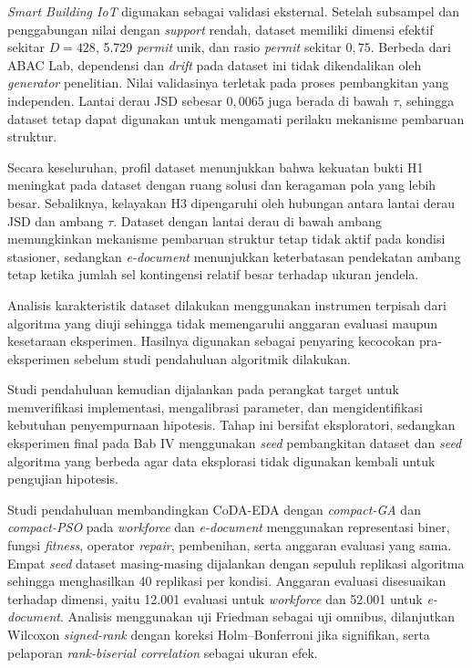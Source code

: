\textit{Smart Building IoT} digunakan sebagai validasi eksternal. 
Setelah subsampel dan penggabungan nilai dengan \textit{support} rendah, dataset memiliki dimensi efektif sekitar $D=428$, 5.729 \textit{permit} unik, dan rasio \textit{permit} sekitar $0,75$. 
Berbeda dari ABAC Lab, dependensi dan \textit{drift} pada dataset ini tidak dikendalikan oleh \textit{generator} penelitian. 
Nilai validasinya terletak pada proses pembangkitan yang independen. 
Lantai derau JSD sebesar $0,0065$ juga berada di bawah $\tau$, sehingga dataset tetap dapat digunakan untuk mengamati perilaku mekanisme pembaruan struktur.

Secara keseluruhan, profil dataset menunjukkan bahwa kekuatan bukti H1 meningkat pada dataset dengan ruang solusi dan keragaman pola yang lebih besar. 
Sebaliknya, kelayakan H3 dipengaruhi oleh hubungan antara lantai derau JSD dan ambang $\tau$. 
Dataset dengan lantai derau di bawah ambang memungkinkan mekanisme pembaruan struktur tetap tidak aktif pada kondisi stasioner, sedangkan \textit{e-document} menunjukkan keterbatasan pendekatan ambang tetap ketika jumlah sel kontingensi relatif besar terhadap ukuran jendela.

Analisis karakteristik dataset dilakukan menggunakan instrumen terpisah dari algoritma yang diuji sehingga tidak memengaruhi anggaran evaluasi maupun kesetaraan eksperimen. 
Hasilnya digunakan sebagai penyaring kecocokan pra-eksperimen sebelum studi pendahuluan algoritmik dilakukan.

Studi pendahuluan kemudian dijalankan pada perangkat target untuk memverifikasi implementasi, mengalibrasi parameter, dan mengidentifikasi kebutuhan penyempurnaan hipotesis. 
Tahap ini bersifat eksploratori, sedangkan eksperimen final pada Bab IV menggunakan \textit{seed} pembangkitan dataset dan \textit{seed} algoritma yang berbeda agar data eksplorasi tidak digunakan kembali untuk pengujian hipotesis.

Studi pendahuluan membandingkan CoDA-EDA dengan \textit{compact-GA} dan \textit{compact-PSO} pada \textit{workforce} dan \textit{e-document} menggunakan representasi biner, fungsi \textit{fitness}, operator \textit{repair}, pembenihan, serta anggaran evaluasi yang sama. 
Empat \textit{seed} dataset masing-masing dijalankan dengan sepuluh replikasi algoritma sehingga menghasilkan 40 replikasi per kondisi. 
Anggaran evaluasi disesuaikan terhadap dimensi, yaitu 12.001 evaluasi untuk \textit{workforce} dan 52.001 untuk \textit{e-document}. 
Analisis menggunakan uji Friedman sebagai uji omnibus, dilanjutkan Wilcoxon \textit{signed-rank} dengan koreksi Holm–Bonferroni jika signifikan, serta pelaporan \textit{rank-biserial correlation} sebagai ukuran efek.

